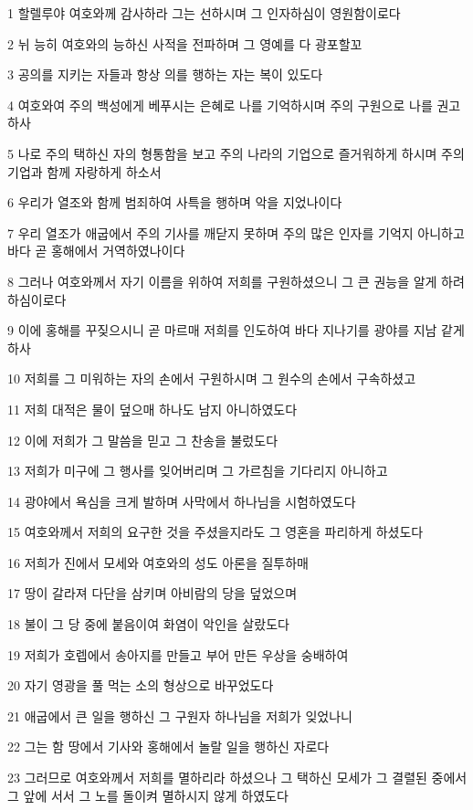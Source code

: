 \par 1 할렐루야 여호와께 감사하라 그는 선하시며 그 인자하심이 영원함이로다
\par 2 뉘 능히 여호와의 능하신 사적을 전파하며 그 영예를 다 광포할꼬
\par 3 공의를 지키는 자들과 항상 의를 행하는 자는 복이 있도다
\par 4 여호와여 주의 백성에게 베푸시는 은혜로 나를 기억하시며 주의 구원으로 나를 권고하사
\par 5 나로 주의 택하신 자의 형통함을 보고 주의 나라의 기업으로 즐거워하게 하시며 주의 기업과 함께 자랑하게 하소서
\par 6 우리가 열조와 함께 범죄하여 사특을 행하며 악을 지었나이다
\par 7 우리 열조가 애굽에서 주의 기사를 깨닫지 못하며 주의 많은 인자를 기억지 아니하고 바다 곧 홍해에서 거역하였나이다
\par 8 그러나 여호와께서 자기 이름을 위하여 저희를 구원하셨으니 그 큰 권능을 알게 하려 하심이로다
\par 9 이에 홍해를 꾸짖으시니 곧 마르매 저희를 인도하여 바다 지나기를 광야를 지남 같게 하사
\par 10 저희를 그 미워하는 자의 손에서 구원하시며 그 원수의 손에서 구속하셨고
\par 11 저희 대적은 물이 덮으매 하나도 남지 아니하였도다
\par 12 이에 저희가 그 말씀을 믿고 그 찬송을 불렀도다
\par 13 저희가 미구에 그 행사를 잊어버리며 그 가르침을 기다리지 아니하고
\par 14 광야에서 욕심을 크게 발하며 사막에서 하나님을 시험하였도다
\par 15 여호와께서 저희의 요구한 것을 주셨을지라도 그 영혼을 파리하게 하셨도다
\par 16 저희가 진에서 모세와 여호와의 성도 아론을 질투하매
\par 17 땅이 갈라져 다단을 삼키며 아비람의 당을 덮었으며
\par 18 불이 그 당 중에 붙음이여 화염이 악인을 살랐도다
\par 19 저희가 호렙에서 송아지를 만들고 부어 만든 우상을 숭배하여
\par 20 자기 영광을 풀 먹는 소의 형상으로 바꾸었도다
\par 21 애굽에서 큰 일을 행하신 그 구원자 하나님을 저희가 잊었나니
\par 22 그는 함 땅에서 기사와 홍해에서 놀랄 일을 행하신 자로다
\par 23 그러므로 여호와께서 저희를 멸하리라 하셨으나 그 택하신 모세가 그 결렬된 중에서 그 앞에 서서 그 노를 돌이켜 멸하시지 않게 하였도다
